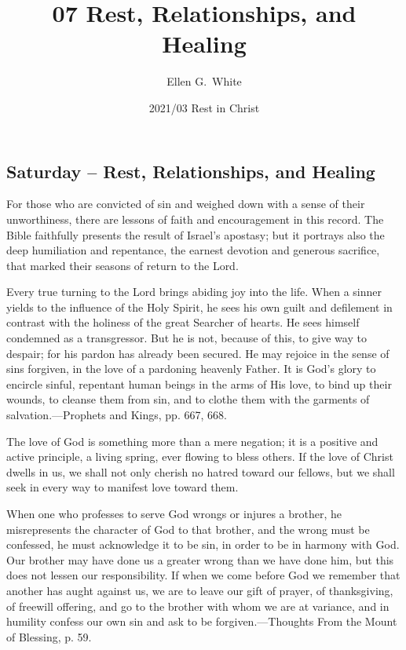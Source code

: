 \documentclass[a4paper, 10pt, twoside, headings=small]{scrartcl}
\title{07 Rest, Relationships, and Healing}
\author{Ellen G.\ White}
\date{2021/03 Rest in Christ}
\begin{document}
\maketitle

\thispagestyle{empty}

\pagestyle{fancy}

\begin{multicols}{2}

\section*{Saturday – Rest, Relationships, and Healing}

For those who are convicted of sin and weighed down with a sense of their unworthiness, there are lessons of faith and encouragement in this record. The Bible faithfully presents the result of Israel’s apostasy; but it portrays also the deep humiliation and repentance, the earnest devotion and generous sacrifice, that marked their seasons of return to the Lord.

Every true turning to the Lord brings abiding joy into the life. When a sinner yields to the influence of the Holy Spirit, he sees his own guilt and defilement in contrast with the holiness of the great Searcher of hearts. He sees himself condemned as a transgressor. But he is not, because of this, to give way to despair; for his pardon has already been secured. He may rejoice in the sense of sins forgiven, in the love of a pardoning heavenly Father. It is God’s glory to encircle sinful, repentant human beings in the arms of His love, to bind up their wounds, to cleanse them from sin, and to clothe them with the garments of salvation.—Prophets and Kings, pp. 667, 668.

The love of God is something more than a mere negation; it is a positive and active principle, a living spring, ever flowing to bless others. If the love of Christ dwells in us, we shall not only cherish no hatred toward our fellows, but we shall seek in every way to manifest love toward them.

When one who professes to serve God wrongs or injures a brother, he misrepresents the character of God to that brother, and the wrong must be confessed, he must acknowledge it to be sin, in order to be in harmony with God. Our brother may have done us a greater wrong than we have done him, but this does not lessen our responsibility. If when we come before God we remember that another has aught against us, we are to leave our gift of prayer, of thanksgiving, of freewill offering, and go to the brother with whom we are at variance, and in humility confess our own sin and ask to be forgiven.—Thoughts From the Mount of Blessing, p. 59.


\end{multicols}
\end{document}
